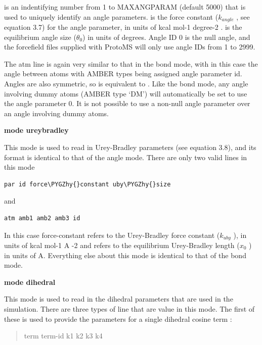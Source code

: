 \documentclass[letterpaper,10pt,english]{sphinxmanual}
\def\PYGZhy{\char`\-}
\begin{document}
 is an indentifying number from 1 to MAXANGPARAM (default 5000) that is used to uniquely identify an angle parameters.  is the force constant (\(k_{angle}\) , see equation 3.7) for the angle parameter, in units of kcal mol-1 degree-2 .  is the equilibrium angle size (\(\theta_0\)) in units of degrees. Angle ID 0 is the null angle, and the forcefield files supplied with ProtoMS will only use angle IDs from 1 to 2999.

The atm line is again very similar to that in the bond mode, with in this case the angle between atoms with AMBER types  being assigned angle parameter id. Angles are also symmetric, so  is equivalent to . Like the bond mode, any angle involving dummy atoms (AMBER type ‘DM’) will automatically be set to use the angle parameter 0. It is not possible to use a non-null angle parameter over an angle involving dummy atoms.

\textbf{mode ureybradley}

This mode is used to read in Urey-Bradley parameters (see equation 3.8), and its format is identical to that of the angle mode. There are only two valid lines in this mode

\begin{Verbatim}[commandchars=\\\{\}]
par id force\PYGZhy{}constant uby\PYGZhy{}size
\end{Verbatim}

and

\begin{Verbatim}[commandchars=\\\{\}]
atm amb1 amb2 amb3 id
\end{Verbatim}

In this case force-constant refers to the Urey-Bradley force constant (\(k_{uby}\) ), in units of kcal mol-1 A -2 and  refers to the equilibrium Urey-Bradley length (\(x_0\) ) in units of A. Everything else about this mode is identical to that of the bond mode.

\textbf{mode dihedral}

This mode is used to read in the dihedral parameters that are used in the simulation. There are three types of line that are value in this mode. The first of these is used to provide the parameters for a single dihedral cosine term :
\begin{quote}

term term-id k1 k2 k3 k4
\end{quote}
\end{document}
